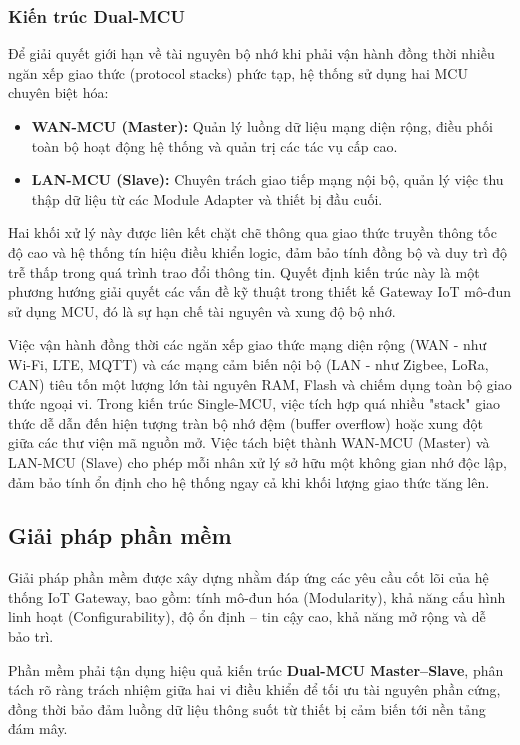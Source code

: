             \subsubsection{Kiến trúc Dual-MCU}
            Để giải quyết giới hạn về tài nguyên bộ nhớ khi phải vận hành đồng thời nhiều ngăn xếp giao thức (protocol stacks) phức tạp, hệ thống sử dụng hai MCU chuyên biệt hóa:
            \begin{itemize}
                \item \textbf{WAN-MCU (Master):} Quản lý luồng dữ liệu mạng diện rộng, điều phối toàn bộ hoạt động hệ thống và quản trị các tác vụ cấp cao.
                \item \textbf{LAN-MCU (Slave):} Chuyên trách giao tiếp mạng nội bộ, quản lý việc thu thập dữ liệu từ các Module Adapter và thiết bị đầu cuối.
            \end{itemize}
            Hai khối xử lý này được liên kết chặt chẽ thông qua giao thức truyền thông tốc độ cao và hệ thống tín hiệu điều khiển logic, đảm bảo tính đồng bộ và duy trì độ trễ thấp trong quá trình trao đổi thông tin. Quyết định kiến trúc này là một phương hướng giải quyết các vấn đề kỹ thuật trong thiết kế Gateway IoT mô-đun sử dụng MCU, đó là sự hạn chế tài nguyên và xung độ bộ nhớ.

            Việc vận hành đồng thời các ngăn xếp giao thức mạng diện rộng (WAN - như Wi-Fi, LTE, MQTT) và các mạng cảm biến nội bộ (LAN - như Zigbee, LoRa, CAN) tiêu tốn một lượng lớn tài nguyên RAM, Flash và chiếm dụng toàn bộ giao thức ngoại vi. Trong kiến trúc Single-MCU, việc tích hợp quá nhiều "stack" giao thức dễ dẫn đến hiện tượng tràn bộ nhớ đệm (buffer overflow) hoặc xung đột giữa các thư viện mã nguồn mở. Việc tách biệt thành WAN-MCU (Master) và LAN-MCU (Slave) cho phép mỗi nhân xử lý sở hữu một không gian nhớ độc lập, đảm bảo tính ổn định cho hệ thống ngay cả khi khối lượng giao thức tăng lên.


    \subsection{Giải pháp phần mềm}
        Giải pháp phần mềm được xây dựng nhằm đáp ứng các yêu cầu cốt lõi của hệ thống IoT Gateway, bao gồm: tính mô-đun hóa (Modularity), khả năng cấu hình linh hoạt (Configurability), độ ổn định -- tin cậy cao, khả năng mở rộng và dễ bảo trì.

        Phần mềm phải tận dụng hiệu quả kiến trúc \textbf{Dual-MCU Master--Slave}, phân tách rõ ràng trách nhiệm giữa hai vi điều khiển để tối ưu tài nguyên phần cứng, đồng thời bảo đảm luồng dữ liệu thông suốt từ thiết bị cảm biến tới nền tảng đám mây.

